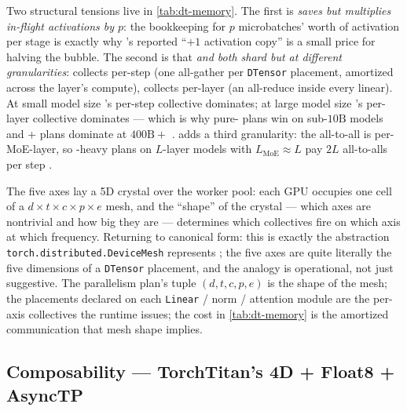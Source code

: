 Two structural tensions live in \cref{tab:dt-memory}. The first is
\emph{ saves  but multiplies in-flight activations by
$p$}: the bookkeeping for $p$ microbatches' worth of activation per
stage is exactly why 's reported ``$+1$ activation copy''
\citep[\S 3.2.1]{deepseek-v3} is a small price for halving the bubble.
The second is that \emph{ and  both shard  but at
different granularities}:  collects per-step (one all-gather per
\texttt{DTensor} placement, amortized across the layer's compute), 
collects per-layer (an all-reduce inside every linear). At small model
size 's per-step collective dominates; at large model size 's
per-layer collective dominates --- which is why pure- plans win on
sub-$10\text{B}$ models and + plans dominate at $400\text{B}{+}$
\citep[\S 1; \S 2.1.3]{torchtitan2024}.  adds a third granularity:
the all-to-all is per-MoE-layer, so -heavy plans on $L$-layer models
with $L_{\text{MoE}} \approx L$ pay $2 L$ all-to-alls per step
\citep[\S 3.2]{deepseek-v3}.

\begin{analogy}
The five axes lay a 5D crystal over the worker pool: each GPU occupies
one cell of a $d \times t \times c \times p \times e$ mesh, and the
``shape'' of the crystal --- which axes are nontrivial and how big they
are --- determines which collectives fire on which axis at which
frequency. Returning to canonical form: this is exactly the abstraction
\texttt{torch.distributed.DeviceMesh} represents \citep[\S
2.1.1]{torchtitan2024}; the five axes are quite literally the five
dimensions of a \texttt{DTensor} placement, and the analogy is
operational, not just suggestive. The parallelism plan's tuple
$(d, t, c, p, e)$ is the shape of the mesh; the placements declared on
each \texttt{Linear} / norm / attention module are the per-axis
collectives the runtime issues; the cost in \cref{tab:dt-memory} is the
amortized communication that mesh shape implies.
\end{analogy}

\subsection{Composability --- TorchTitan's 4D + Float8 + AsyncTP}
\label{sec:dt-torchtitan}

